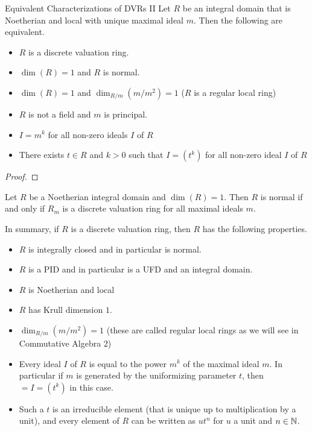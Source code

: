 \documentclass[a4paper]{article}
\begin{document}
\begin{prp}{Equivalent Characterizations of DVRs II}{} Let $R$ be an integral domain that is Noetherian and local with unique maximal ideal $m$. Then the following are equivalent. 
\begin{itemize}
\item $R$ is a discrete valuation ring. 
\item $\dim(R)=1$ and $R$ is normal. 
\item $\dim(R)=1$ and $\dim_{R/m}(m/m^2)=1$ ($R$ is a regular local ring)
\item $R$ is not a field and $m$ is principal. 
\item $I=m^k$ for all non-zero ideals $I$ of $R$
\item There exists $t\in R$ and $k>0$ such that $I=(t^k)$ for all non-zero ideal $I$ of $R$
\end{itemize} \tcbline
\begin{proof}
\end{proof}
\end{prp}

\begin{prp}{}{} Let $R$ be a Noetherian integral domain and $\dim(R)=1$. Then $R$ is normal if and only if $R_m$ is a discrete valuation ring for all maximal ideals $m$. 
\end{prp}

In summary, if $R$ is a discrete valuation ring, then $R$ has the following properties. 
\begin{itemize}
\item $R$ is integrally closed and in particular is normal. 
\item $R$ is a PID and in particular is a UFD and an integral domain. 
\item $R$ is Noetherian and local
\item $R$ has Krull dimension $1$. 
\item $\dim_{R/m}(m/m^2)=1$ (these are called regular local rings as we will see in Commutative Algebra $2$)
\item Every ideal $I$ of $R$ is equal to the power $m^k$ of the maximal ideal $m$. In particular if $m$ is generated by the uniformizing parameter $t$, then $=I=(t^k)$ in this case. 
\item Such a $t$ is an irreducible element (that is unique up to multiplication by a unit), and every element of $R$ can be written as $ut^n$ for $u$ a unit and $n\in\mathbb{N}$. 
\end{itemize}
\end{document}
